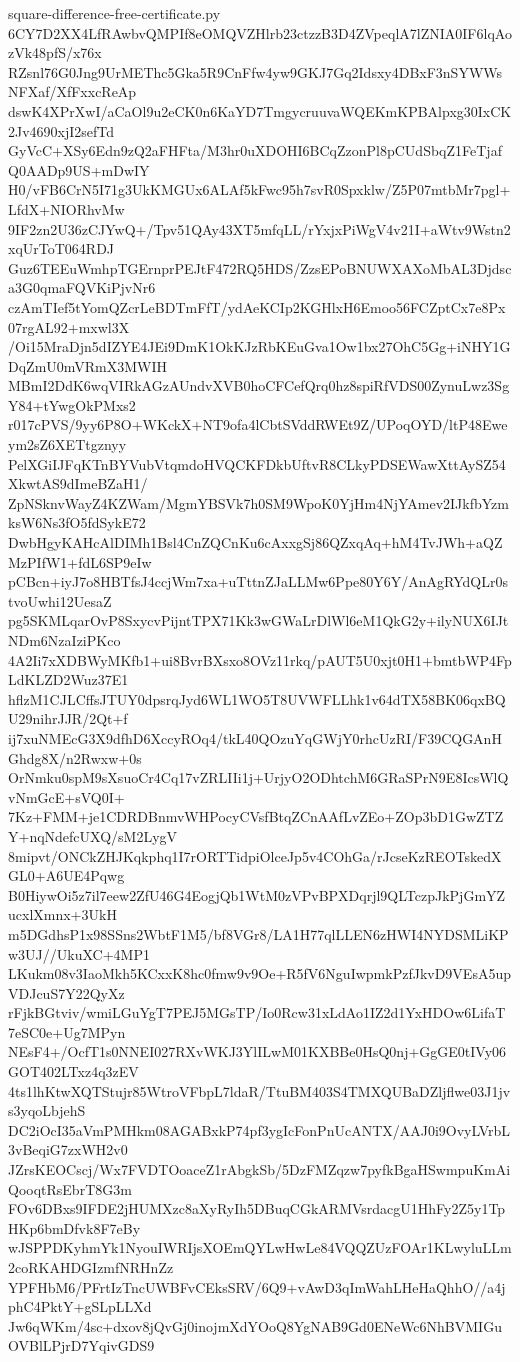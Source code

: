 \documentclass[11pt]{article}
\theoremstyle{definition}
\theoremstyle{remark}
\begin{document}
\begin{filecontents*}[overwrite]{square-difference-free-certificate.py}
6CY7D2XX4LfRAwbvQMPIf8eOMQVZHlrb23ctzzB3D4ZVpeqlA7lZNIA0IF6lqAozVk48pfS/x76x
RZsnl76G0Jng9UrMEThc5Gka5R9CnFfw4yw9GKJ7Gq2Idsxy4DBxF3nSYWWsNFXaf/XfFxxcReAp
dswK4XPrXwI/aCaOl9u2eCK0n6KaYD7TmgycruuvaWQEKmKPBAlpxg30IxCK2Jv4690xjI2sefTd
GyVcC+XSy6Edn9zQ2aFHFta/M3hr0uXDOHI6BCqZzonPl8pCUdSbqZ1FeTjafQ0AADp9US+mDwIY
H0/vFB6CrN5I71g3UkKMGUx6ALAf5kFwc95h7svR0Spxklw/Z5P07mtbMr7pgl+LfdX+NIORhvMw
9IF2zn2U36zCJYwQ+/Tpv51QAy43XT5mfqLL/rYxjxPiWgV4v21I+aWtv9Wstn2xqUrToT064RDJ
Guz6TEEuWmhpTGErnprPEJtF472RQ5HDS/ZzsEPoBNUWXAXoMbAL3Djdsca3G0qmaFQVKiPjvNr6
czAmTIef5tYomQZcrLeBDTmFfT/ydAeKCIp2KGHlxH6Emoo56FCZptCx7e8Px07rgAL92+mxwl3X
/Oi15MraDjn5dIZYE4JEi9DmK1OkKJzRbKEuGva1Ow1bx27OhC5Gg+iNHY1GDqZmU0mVRmX3MWIH
MBmI2DdK6wqVIRkAGzAUndvXVB0hoCFCefQrq0hz8spiRfVDS00ZynuLwz3SgY84+tYwgOkPMxs2
r017cPVS/9yy6P8O+WKckX+NT9ofa4lCbtSVddRWEt9Z/UPoqOYD/ltP48Eweym2sZ6XETtgznyy
PelXGiIJFqKTnBYVubVtqmdoHVQCKFDkbUftvR8CLkyPDSEWawXttAySZ54XkwtAS9dImeBZaH1/
ZpNSknvWayZ4KZWam/MgmYBSVk7h0SM9WpoK0YjHm4NjYAmev2IJkfbYzmksW6Ns3fO5fdSykE72
DwbHgyKAHcAlDIMh1Bsl4CnZQCnKu6cAxxgSj86QZxqAq+hM4TvJWh+aQZMzPIfW1+fdL6SP9eIw
pCBcn+iyJ7o8HBTfsJ4ccjWm7xa+uTttnZJaLLMw6Ppe80Y6Y/AnAgRYdQLr0stvoUwhi12UesaZ
pg5SKMLqarOvP8SxycvPijntTPX71Kk3wGWaLrDlWl6eM1QkG2y+ilyNUX6IJtNDm6NzaIziPKco
4A2Ii7xXDBWyMKfb1+ui8BvrBXsxo8OVz11rkq/pAUT5U0xjt0H1+bmtbWP4FpLdKLZD2Wuz37E1
hflzM1CJLCffsJTUY0dpsrqJyd6WL1WO5T8UVWFLLhk1v64dTX58BK06qxBQU29nihrJJR/2Qt+f
ij7xuNMEcG3X9dfhD6XccyROq4/tkL40QOzuYqGWjY0rhcUzRI/F39CQGAnHGhdg8X/n2Rwxw+0s
OrNmku0spM9sXsuoCr4Cq17vZRLIIi1j+UrjyO2ODhtchM6GRaSPrN9E8IcsWlQvNmGcE+sVQ0I+
7Kz+FMM+je1CDRDBnmvWHPocyCVsfBtqZCnAAfLvZEo+ZOp3bD1GwZTZY+nqNdefcUXQ/sM2LygV
8mipvt/ONCkZHJKqkphq1I7rORTTidpiOlceJp5v4COhGa/rJcseKzREOTskedXGL0+A6UE4Pqwg
B0HiywOi5z7il7eew2ZfU46G4EogjQb1WtM0zVPvBPXDqrjl9QLTczpJkPjGmYZucxlXmnx+3UkH
m5DGdhsP1x98SSns2WbtF1M5/bf8VGr8/LA1H77qlLLEN6zHWI4NYDSMLiKPw3UJ//UkuXC+4MP1
LKukm08v3IaoMkh5KCxxK8hc0fmw9v9Oe+R5fV6NguIwpmkPzfJkvD9VEsA5upVDJcuS7Y22QyXz
rFjkBGtviv/wmiLGuYgT7PEJ5MGsTP/Io0Rcw31xLdAo1IZ2d1YxHDOw6LifaT7eSC0e+Ug7MPyn
NEsF4+/OcfT1s0NNEI027RXvWKJ3YlILwM01KXBBe0HsQ0nj+GgGE0tIVy06GOT402LTxz4q3zEV
4ts1lhKtwXQTStujr85WtroVFbpL7ldaR/TtuBM403S4TMXQUBaDZljflwe03J1jvs3yqoLbjehS
DC2iOcI35aVmPMHkm08AGABxkP74pf3ygIcFonPnUcANTX/AAJ0i9OvyLVrbL3vBeqiG7zxWH2v0
JZrsKEOCscj/Wx7FVDTOoaceZ1rAbgkSb/5DzFMZqzw7pyfkBgaHSwmpuKmAiQooqtRsEbrT8G3m
FOv6DBxs9IFDE2jHUMXzc8aXyRyIh5DBuqCGkARMVsrdacgU1HhFy2Z5y1TpHKp6bmDfvk8F7eBy
wJSPPDKyhmYk1NyouIWRIjsXOEmQYLwHwLe84VQQZUzFOAr1KLwyluLLm2coRKAHDGIzmfNRHnZz
YPFHbM6/PFrtIzTncUWBFvCEksSRV/6Q9+vAwD3qImWahLHeHaQhhO//a4jphC4PktY+gSLpLLXd
Jw6qWKm/4sc+dxov8jQvGj0inojmXdYOoQ8YgNAB9Gd0ENeWc6NhBVMIGuOVBlLPjrD7YqivGDS9

\end{filecontents*}
\end{document}
